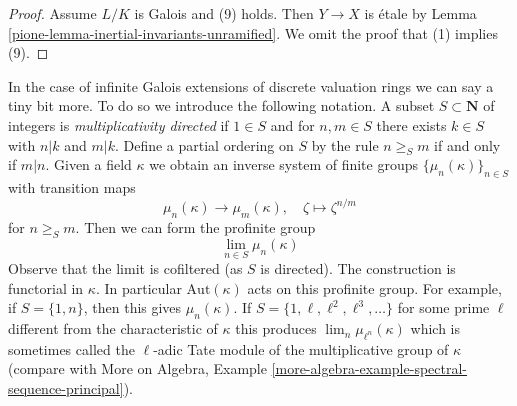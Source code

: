 \begin{proof}
\medskip\noindent
Assume $L/K$ is Galois and (9) holds. Then $Y \to X$ is \'etale
by Lemma \ref{pione-lemma-inertial-invariants-unramified}.
We omit the proof that (1) implies (9).
\end{proof}

In the case of infinite Galois extensions of discrete valuation rings
we can say a tiny bit more. To do so we introduce the following notation.
A subset $S \subset \mathbf{N}$ of integers is {\it multiplicativity directed}
if $1 \in S$ and for $n, m \in S$ there exists $k \in S$ with
$n | k$ and $m | k$. Define a partial ordering on $S$ by the rule
$n \geq_S m$ if and only if $m | n$. Given a field $\kappa$ we obtain
an inverse system of finite groups $\{\mu_n(\kappa)\}_{n \in S}$
with transition maps
$$
\mu_n(\kappa) \longrightarrow \mu_m(\kappa),\quad
\zeta \longmapsto \zeta^{n/m}
$$
for $n \geq_S m$. Then we can form the profinite group
$$
\lim_{n \in S} \mu_n(\kappa)
$$
Observe that the limit is cofiltered (as $S$ is directed).
The construction is functorial in $\kappa$. In particular
$\text{Aut}(\kappa)$ acts on this profinite group.
For example, if $S = \{1, n\}$, then this gives $\mu_n(\kappa)$.
If $S = \{1, \ell, \ell^2, \ell^3, \ldots\}$ for some prime
$\ell$ different from the characteristic of $\kappa$ this produces
$\lim_n \mu_{\ell^n}(\kappa)$
which is sometimes called the $\ell$-adic Tate module of the multiplicative
group of $\kappa$ (compare with
More on Algebra, Example
\ref{more-algebra-example-spectral-sequence-principal}).

